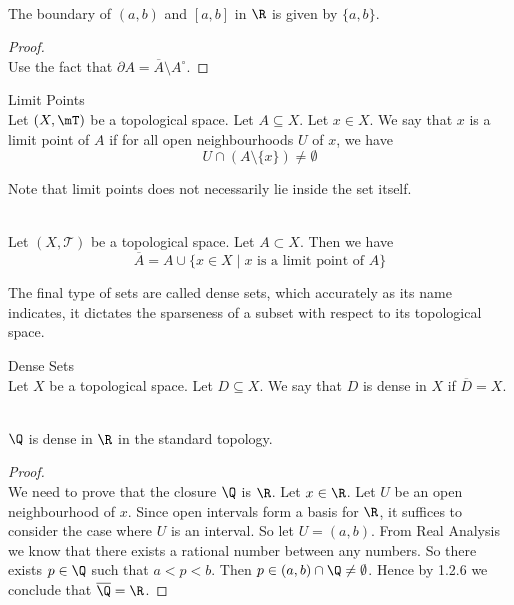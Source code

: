 \documentclass[a4paper]{article}
\begin{document}
\begin{eg}{}{}\\
The boundary of $(a,b)$ and $[a,b]$ in $\R$ is given by $\{a,b\}$. 
\begin{proof}\\
Use the fact that $\partial A=\overline{A}\setminus A^\circ$. 
\end{proof}
\end{eg}

\begin{defn}{Limit Points}{}\\
Let $(X,\mT)$ be a topological space. Let $A\subseteq X$. Let $x\in X$. We say that $x$ is a limit point of $A$ if for all open neighbourhoods $U$ of $x$, we have $$U\cap(A\setminus\{x\})\neq\emptyset$$
\end{defn}

Note that limit points does not necessarily lie inside the set itself. 

\begin{prp}{}{}\\
Let $(X,\mathcal{T})$ be a topological space. Let $A\subset X$. Then we have $$\overline{A}=A\cup\{x\in X\;|\;x\text{ is a limit point of }A\}$$
\end{prp}

The final type of sets are called dense sets, which accurately as its name indicates, it dictates the sparseness of a subset with respect to its topological space. 

\begin{defn}{Dense Sets}{}\\
Let $X$ be a topological space. Let $D\subseteq X$. We say that $D$ is dense in $X$ if $\overline{D}=X$. 
\end{defn}

\begin{eg}{}{}\\
$\Q$ is dense in $\R$ in the standard topology. 
\begin{proof}\\
We need to prove that the closure $\Q$ is $\R$. Let $x\in\R$. Let $U$ be an open neighbourhood of $x$. Since open intervals form a basis for $\R$, it suffices to consider the case where $U$ is an interval. So let $U=(a,b)$. From Real Analysis we know that there exists a rational number between any numbers. So there exists $p\in\Q$ such that $a<p<b$. Then $p\in(a,b)\cap\Q\neq\emptyset$. Hence by 1.2.6 we conclude that $\overline{\Q}=\R$. 
\end{proof}
\end{eg}
\end{document}
